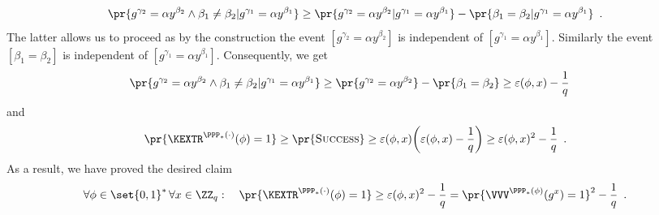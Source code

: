 \documentclass{crypto-exercise}
\begin{document}
\begin{solution}
\begin{align*}
\pr{g^{\gamma_2}=\alpha y^{\beta_2}\wedge\beta_1\neq\beta_2|g^{\gamma_1}=\alpha y^{\beta_1}}\geq \pr{g^{\gamma_2}=\alpha y^{\beta_2}|g^{\gamma_1}=\alpha y^{\beta_1}}- \pr{\beta_1=\beta_2|g^{\gamma_1}=\alpha y^{\beta_1}}\enspace.
\end{align*} 
The latter allows us to proceed as by the construction the event $[g^{\gamma_2}=\alpha y^{\beta_2}]$ is independent of $[g^{\gamma_1}=\alpha y^{\beta_1}]$. Similarly the event $[\beta_1=\beta_2]$ is independent of  $[g^{\gamma_1}=\alpha y^{\beta_1}]$. Consequently, we get
\begin{align*}
\pr{g^{\gamma_2}=\alpha y^{\beta_2}\wedge\beta_1\neq\beta_2|g^{\gamma_1}=\alpha y^{\beta_1}}
&\geq \pr{g^{\gamma_2}=\alpha y^{\beta_2}}- \pr{\beta_1=\beta_2}\geq\varepsilon(\phi,x)-\frac{1}{q}
\end{align*}
and 
\begin{align*}
\pr{\smash{\KEXTR^{\PPP_*(\cdot)}(\phi)=1}}\geq\pr{\textsc{Success}}\geq \varepsilon(\phi,x)\biggl(\varepsilon(\phi,x)-\frac{1}{q}\biggr)\geq \varepsilon(\phi,x)^2-\frac{1}{q}\enspace.
\end{align*}
As a result, we have proved the desired claim
\begin{align*}
 \forall \phi\in\set{0,1}^*\, \forall x\in\ZZ_q:\quad
    \pr{\smash{\KEXTR^{\PPP_*(\cdot)}(\phi)=1}}\geq \varepsilon(\phi, x)^2 -
    \frac{1}{q} = \pr{\smash{\VVV^{\PPP_*(\phi)}(g^x)=1}}^2 - \frac{1}{q} \enspace.
\end{align*}



\end{solution}
\end{document}
